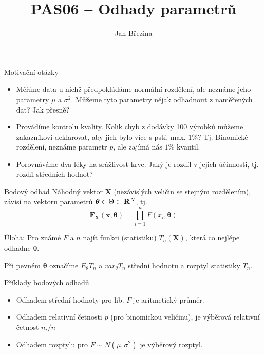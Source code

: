 \documentclass[smaller]{beamer}
\title{PAS06 -- Odhady parametrů}
\author{Jan B\v rezina}
\institute %
{
  Technical University of Liberec
}
\def\Real{{\rm\bf R}}
\def\vc#1{\mathbf{\boldsymbol{#1}}}     %
\def\xskip{{\vspace{2ex}}}
\begin{document}
\begin{frame}
  \titlepage
\end{frame}

\def\df{\usebeamercolor[fg]{my red}\it}

\begin{frame}{Motivační otázky}
 \begin{itemize}
  \item Měříme data u nichž předpokládáme normální rozdělení, ale neznáme jeho parametry $\mu$ a $\sigma^2$.
    Můžeme tyto parametry nějak odhadnout z naměřených dat? Jak přesně?
  \item Provádíme kontrolu kvality. Kolik chyb z dodávky 100 výrobků můžeme zakazníkovi deklarovat, aby jich bylo více s pstí. max. 1\%?
        Tj. Binomické rozdělení, neznáme parametr $p$, ale zajímá nás $1\%$ kvantil.
  \item Porovnáváme dva léky na srážlivost krve. Jaký je rozdíl v jejich účinnosti, tj. rozdíl středních hodnot?
 \end{itemize}

\end{frame}


\begin{frame}{Bodový odhad}
Náhodný vektor $\vc X$ (nezávislých veličin se stejným rozdělením), závisí na vektoru parametrů
$\vc \theta \in \Theta \subset \Real^N$, tj.
\[
 \vc F_{\vc X}(\vc x, \vc \theta) = \prod_{i=1}^n F(x_i,\vc \theta)
\]

\xskip
Úloha: Pro známé $F$ a $n$ najít funkci (statistiku) $T_n(\vc X)$, která co nejlépe odhadne $\vc \theta$.

Při pevném $\vc \theta$ označíme $E_\theta T_n$ a $var_\theta T_n$ střední hodnotu a rozptyl statistiky $T_n$.
\end{frame}

\begin{frame}{Příklady bodových odhadů.}
 \begin{itemize}
  \item Odhadem střední hodnoty pro lib. $F$ je aritmetický průměr.
  \item Odhadem relativní četnosti $p$ (pro binomickou veličinu), je výběrová relativní četnost $n_i / n$
  \item Odhadem rozptylu pro $F \sim N(\mu, \sigma ^2)$ je výběrový rozptyl.
 \end{itemize}

\end{frame}
\end{document}

